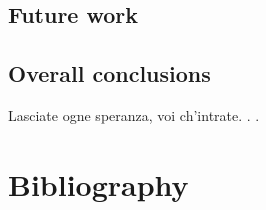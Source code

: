 \documentclass[a4paper, twoside]{templates/ociamthesis}
\begin{document}
\hypertarget{future-work}{%
\section{Future work}\label{future-work}}

\hypertarget{overall-conclusions}{%
\section{Overall conclusions}\label{overall-conclusions}}

\begin{savequote}
Lasciate ogne speranza, voi ch'intrate. . .
\end{savequote}

\hypertarget{bibliography}{%
\chapter{Bibliography}\label{bibliography}}
\end{document}
